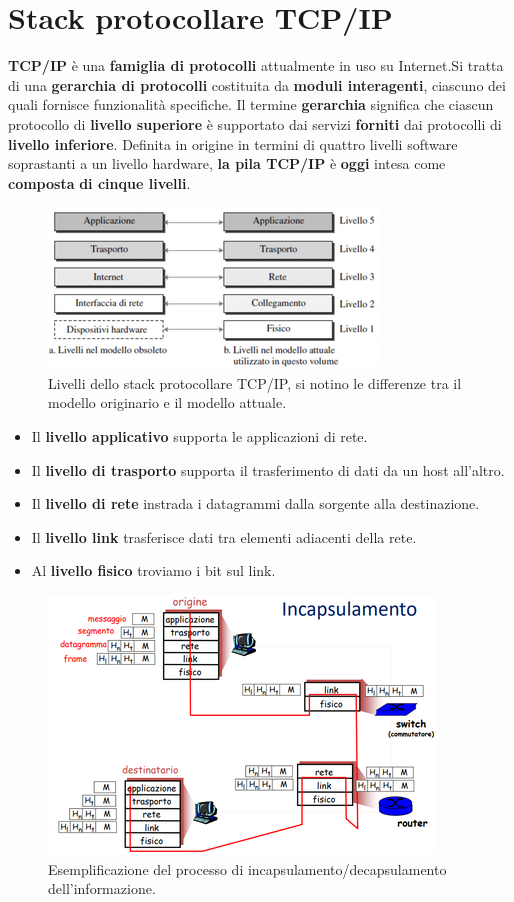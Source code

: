 \documentclass[11pt,a4paper,oneside]{book}
\theoremstyle{definition}
\begin{document}
\chapter{Stack protocollare TCP/IP}
\textbf{TCP/IP} è una \textbf{famiglia di protocolli} attualmente
in uso su Internet.\newline Si tratta di una \textbf{gerarchia di
	protocolli} costituita da \textbf{moduli interagenti}, ciascuno dei
quali fornisce funzionalità specifiche.
Il termine \textbf{gerarchia} significa che ciascun protocollo di
\textbf{livello superiore} è supportato dai servizi \textbf{forniti} dai
protocolli di \textbf{livello inferiore}.
Definita in origine in termini di quattro livelli software
soprastanti a un livello hardware, \textbf{la pila TCP/IP} è \textbf{oggi}
intesa come \textbf{composta} \textbf{di cinque livelli}.
\begin{figure}[!h]
	\includegraphics[scale=0.6]{Immagini/TCP_IP.png}
	\centering
	\caption{Livelli dello stack protocollare TCP/IP, si notino le differenze tra il modello originario e il modello attuale.}
\end{figure}
\begin{itemize}
	\item Il \textbf{livello applicativo} supporta le applicazioni di rete.
	\item Il \textbf{livello di trasporto} supporta il trasferimento di dati da un host all'altro.
	\item Il \textbf{livello di rete} instrada i datagrammi dalla sorgente alla destinazione.
	\item Il \textbf{livello link} trasferisce dati tra elementi adiacenti della rete.
	\item  Al \textbf{livello fisico} troviamo i bit sul link.
\end{itemize}
\begin{figure}[!h]
	\includegraphics[scale=0.5]{Immagini/Incapsulamento_m.png}
	\centering
	\caption{Esemplificazione del processo di incapsulamento/decapsulamento dell'informazione.}
\end{figure}
\end{document}
